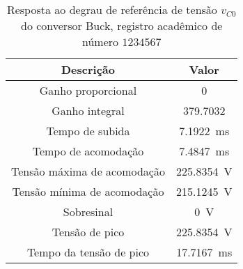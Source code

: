 \begin{table}[!ht]
\centering
\caption{Resposta ao degrau de referência de tensão $v_{C0}$ do conversor Buck, registro acadêmico de número $1234567$}
\label{tab:resposta1malha}
\begin{tabular}{@{}cc@{}}
\toprule
\textbf{Descrição} & \textbf{Valor}\\ \midrule
Ganho proporcional & \SI{0}{}\\
Ganho integral & \SI{379.7032}{}\\
Tempo de subida & \SI{7.1922}{\milli\s}\\
Tempo de acomodação & \SI{7.4847}{\milli\s}\\
Tensão máxima de acomodação & \SI{225.8354}{\V}\\
Tensão mínima de acomodação & \SI{215.1245}{\V}\\
Sobresinal & \SI{0}{\V}\\
Tensão de pico & \SI{225.8354}{\V}\\
Tempo da tensão de pico & \SI{17.7167}{\milli\s}\\
\bottomrule
\end{tabular}
\end{table}

